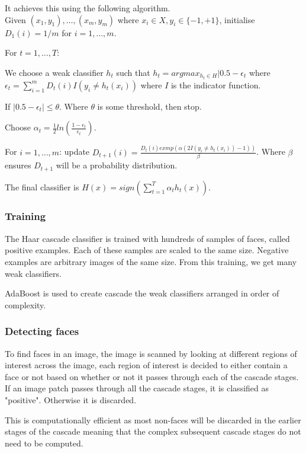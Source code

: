 \documentclass{article}
\begin{document}
It achieves this using the following algorithm.\\

\noindent Given $(x_1, y_1),\ldots,(x_m,y_m)$ where $x_i\in X, y_i\in\{-1,+1\}$, initialise $D_1(i)=1/m$ for $i=1,\ldots,m$.

\noindent For $t=1,\ldots,T$:

We choose a weak classifier $h_t$ such that $h_t = argmax_{h_t\in H}|0.5 - \epsilon_t$ where $\epsilon_t = \sum_{i=1}^m D_t(i)I(y_i\ne h_t(x_i))$ where $I$ is the indicator function.

If $|0.5 - \epsilon_t| \le \theta$. Where $\theta$ is some threshold, then stop.

Choose $\alpha_t=\frac{1}{2}ln(\frac{1-\epsilon_t}{\epsilon_t})$.

For $i=1,\ldots,m$: update $D_{t+1}(i)=\frac{D_t(i)exmp(\alpha(2I(y_i\ne h_t(x_i))-1))}{\beta}$. Where $\beta$ ensures $D_{t+1}$ will be a probability distribution.

The final classifier is $H(x)=sign(\sum_{t=1}^T\alpha_th_t(x))$.



\subsubsection{Training}
The Haar cascade classifier is trained with hundreds of samples of faces, called positive examples. Each of these samples are scaled to the same size. Negative examples are arbitrary images of the same size. From this training, we get many weak classifiers.

AdaBoost is used to create cascade the weak classifiers arranged in order of complexity.

\subsubsection{Detecting faces}
To find faces in an image, the image is scanned by looking at different regions of interest across the image, each region of interest is decided to either contain a face or not based on whether or not it passes through each of the cascade stages. If an image patch passes through all the cascade stages, it is classified as "positive". Otherwise it is discarded.

This is computationally efficient as most non-faces will be discarded in the earlier stages of the cascade meaning that the complex subsequent cascade stages do not need to be computed.
\end{document}
